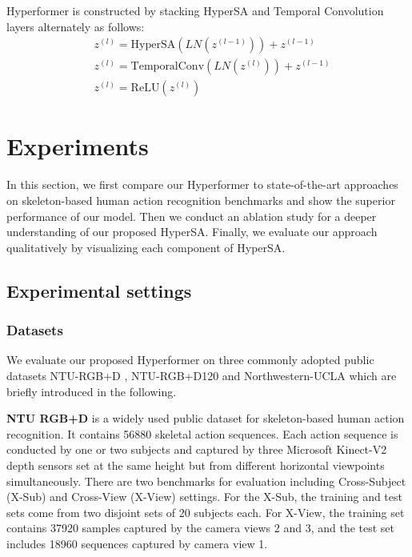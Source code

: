 \documentclass[10pt,twocolumn,letterpaper]{article}
\begin{document}
Hyperformer is constructed by stacking HyperSA and Temporal Convolution layers alternately as follows:
\begin{align}
    & z^{(l)} = \text{HyperSA}(LN(z^{(l-1)})) + z^{(l-1)} \\
    & z^{(l)} = \text{TemporalConv}(LN(z^{(l)})) + z^{(l-1)} \\
    & z^{(l)} = \text{ReLU}(z^{(l)})
\end{align}














\section{Experiments}
In this section, we first compare our Hyperformer to  state-of-the-art approaches on skeleton-based human action recognition benchmarks and show the superior performance of our model. 
Then we conduct an ablation study for a deeper understanding of our proposed HyperSA. Finally, we evaluate our approach qualitatively by visualizing each component of HyperSA.

\subsection{Experimental settings}
\subsubsection{Datasets}
\label{data}
We evaluate our proposed Hyperformer on three commonly adopted public datasets NTU-RGB+D \cite{shahroudy2016ntu}, NTU-RGB+D120 \cite{liu2019ntu} and Northwestern-UCLA \cite{wang2014cross} which are briefly introduced in the following. 



\noindent
\textbf{NTU RGB+D} 
\cite{shahroudy2016ntu} is a widely used public dataset for skeleton-based human action recognition. It contains
56880 skeletal action sequences. 
Each action sequence is conducted by one or two subjects and captured by three Microsoft Kinect-V2 depth sensors set at the same height but from different horizontal viewpoints simultaneously. 
There are two benchmarks for evaluation including Cross-Subject (X-Sub)
and Cross-View (X-View) settings. For the X-Sub, the training and test sets come from two disjoint sets of 20 subjects each. 
For X-View, the training set contains 37920 samples captured by the camera views 2 and 3, and the test set includes 18960 sequences captured by camera view 1. 
\end{document}
